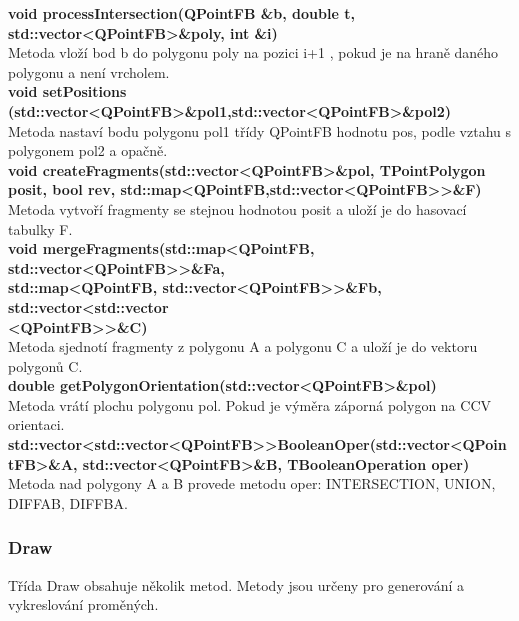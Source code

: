 \documentclass[a4paper, 12pt]{article}
\begin{document}
\textbf{void processIntersection(QPointFB \&b, double t, std::vector\textless QPointFB\textgreater \&poly, int \&i)}\\
Metoda vloží bod b do polygonu poly na pozici i+1 , pokud je na hraně daného polygonu a není vrcholem.\\

\textbf{void setPositions (std::vector\textless QPointFB\textgreater \&pol1,std::vector\textless QPointFB\textgreater \&pol2)}\\
Metoda nastaví bodu polygonu pol1 třídy QPointFB hodnotu pos, podle vztahu s polygonem pol2 a opačně.\\

\textbf{void createFragments(std::vector\textless QPointFB\textgreater \&pol, TPointPolygon posit, bool rev, std::map\textless QPointFB,std::vector\textless QPointFB\textgreater \textgreater  \&F)}\\
Metoda vytvoří fragmenty se stejnou hodnotou posit a uloží je do hasovací tabulky F.\\

\textbf{void mergeFragments(std::map\textless QPointFB, std::vector\textless QPointFB\textgreater \textgreater \&Fa,\\std::map\textless QPointFB, std::vector\textless QPointFB\textgreater \textgreater \&Fb, std::vector\textless std::vector\\ \textless QPointFB\textgreater \textgreater \&C)}\\
Metoda sjednotí fragmenty z polygonu A a polygonu C a uloží je do vektoru polygonů C.\\

\textbf{double getPolygonOrientation(std::vector\textless QPointFB\textgreater \&pol)}\\
Metoda vrátí plochu polygonu pol. Pokud je výměra záporná polygon na CCV orientaci.\\

\textbf{std::vector\textless std::vector\textless QPointFB\textgreater \textgreater BooleanOper(std::vector\textless QPointFB\textgreater \&A, std::vector\textless QPointFB\textgreater \&B, TBooleanOperation oper)}\\
Metoda nad polygony A a B provede metodu oper: INTERSECTION, UNION, DIFFAB, DIFFBA.\\


\subsubsection{Draw}
Třída Draw obsahuje několik metod. Metody jsou určeny pro generování a vykreslování proměných.
\\
\end{document}
